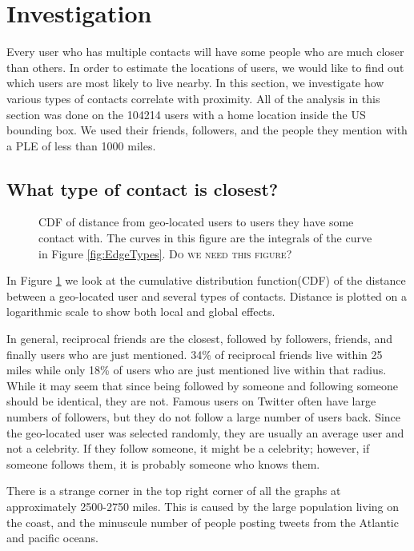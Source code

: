 \documentclass{sig-alternate}
\begin{document}
\section{Investigation}
Every user who has multiple contacts will have some people who are much
closer than others. In order to estimate the locations of users, we would like
to find out which users are most likely to live nearby.  In this section, we
investigate how various types of contacts correlate with proximity.
All of the analysis in this section was done on the 104214 users with a home
location inside the US bounding box. We used their friends, followers, and the
people they mention with a PLE of less than 1000 miles.

\subsection{What type of contact is closest?}
\begin{figure}
\centering
{}
\caption{
CDF of distance from geo-located users to users they have some contact
with.
The curves in this figure are the integrals of the curve in Figure \ref{fig:EdgeTypes}.
\textsc{Do we need this figure?}
}
\label{fig:EdgeTypesCum}
\end{figure}
In Figure \ref{fig:EdgeTypesCum} we look at the cumulative distribution
function(CDF) of the distance between a geo-located user and several types of
contacts.
Distance is plotted on a logarithmic scale to show both local and
global effects.

In general, reciprocal friends are the closest, followed by followers, friends,
and finally users who are just mentioned.
34\% of reciprocal friends live within 25 miles while only 18\% of users who are
just mentioned live within that radius.
While it may seem that since being followed by someone and following someone
should be identical, they are not.
Famous users on Twitter often have large numbers of followers, but they do not
follow a large number of users back.
Since the geo-located user was selected randomly, they are usually an average
user and not a celebrity.
If they follow someone, it might be a celebrity; however, if someone follows
them, it is probably someone who knows them.

There is a strange corner in the top right corner of all the graphs at
approximately 2500-2750 miles. This is caused by the large population living on the
coast, and the minuscule number of people posting tweets from the Atlantic and
pacific oceans.
\end{document}

